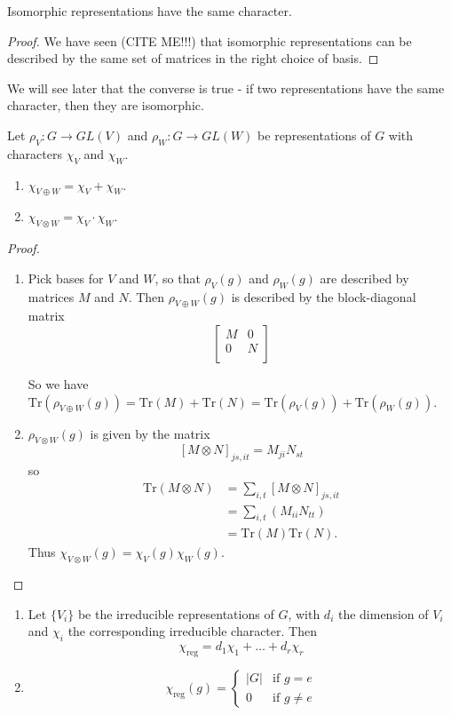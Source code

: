 \begin{prop}
Isomorphic representations have the same character.
\end{prop}
\begin{proof}
We have seen (CITE ME!!!) that isomorphic representations can be described by the same set of matrices in the right choice of basis.
\end{proof}
We will see later that the converse is true - if two representations have the same character, then they are isomorphic.

\begin{prop}
Let $\rho_V \colon G \to GL(V)$ and $\rho_W \colon G \to GL(W)$ be representations of $G$ with characters $\chi_V$ and $\chi_W$.
\begin{enumerate}
\item $\chi _{V \oplus W} = \chi_V + \chi_W$.
\item $\chi_{V \otimes W} = \chi_V \cdot \chi_W$.
\end{enumerate}
\end{prop}
\begin{proof}
\begin{enumerate}
\item Pick bases for $V$ and $W$, so that $\rho_V (g)$ and $\rho_W (g)$ are described by matrices $M$ and $N$.  Then $\rho_{V \oplus W} (g)$ is described by the block-diagonal matrix
\[ \begin{bmatrix}
M & 0 \\
0 & N \\
\end{bmatrix} \]

So we have $\text{Tr} (\rho_{V \oplus W} (g)) = \text{Tr} (M) + \text{Tr}(N) = \text{Tr}(\rho_V (g)) + \text{Tr} (\rho_W (g))$.
\item $\rho_ {V \otimes W}(g)$ is given by the matrix
\[ [M \otimes N ]_{js, it} = M_{ji} N_{st} \]
so
\begin{align*}
\text{Tr} (M \otimes N) &= \sum_{i,t} [M \otimes N]_{js,it} \\
	&= \sum_{i,t} (M_{ii} N_{tt}) \\
	&= \text{Tr} (M) \text{Tr} (N).
\end{align*}
Thus $\chi_{V \otimes W} (g)= \chi_V (g) \chi_W(g)$.
\end{enumerate}
\end{proof}

\begin{prop}
\begin{enumerate}
\item Let $\{ V_i \}$ be the irreducible representations of $G$, with $d_i$  the dimension of  $V_i$ and $\chi_i$ the corresponding irreducible character.  Then
\[ \chi_{\text{reg}} = d_1 \chi_1 + \ldots + d_r \chi_r \]

\item \[  
\chi_{\text{reg}} (g) = \begin{cases} 
|G| &\text{if } g = e \\ 
0 & \text{if } g \neq e 
\end{cases}  \]
\end{enumerate}
\end{prop}

